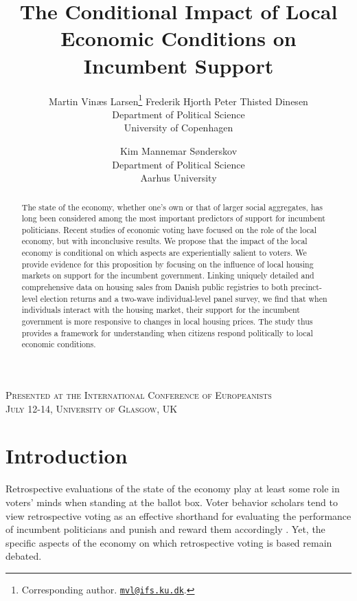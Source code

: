 \documentclass[12pt,a4paper]{article}
\title{\textbf{The Conditional Impact of Local Economic Conditions on Incumbent Support}}
\author{Martin Vinæs Larsen\thanks{Corresponding author. \href{mailto:mvl@ifs.ku.dk}{\texttt{mvl@ifs.ku.dk}}. } \qquad Frederik Hjorth \qquad Peter Thisted  Dinesen \\Department of Political Science \\ University of Copenhagen \and Kim Mannemar  Sønderskov  \\Department of Political Science \\ Aarhus University   }
\begin{document}
	
	\maketitle
	
	\begin{center}
		\textsc{Presented at the International Conference of Europeanists \\
			July 12-14, University of Glasgow, UK }
	\end{center}
	
	\begin{abstract} \noindent The state of the economy, whether one’s own or that of larger social aggregates, has long been considered among the most important predictors of support for incumbent politicians. Recent studies of economic voting have focused on the role of the local economy, but with inconclusive results. We propose that the impact of the local economy is conditional on which aspects are experientially salient to voters. We provide evidence for this proposition by focusing on the influence of local housing markets on support for the incumbent government. Linking uniquely detailed and comprehensive data on housing sales from Danish public registries to both precinct-level election returns and a two-wave individual-level panel survey, we find that when individuals interact with the housing market, their support for the incumbent government is more responsive to changes in local housing prices. The study thus provides a framework for understanding when citizens respond politically to local economic conditions.
		
	\end{abstract}
	
	
	
	\newpage
	
	\onehalfspacing
	
	\section{Introduction}
	
	\noindent Retrospective evaluations of the state of the economy play at least some role in voters' minds when standing at the ballot box. Voter behavior scholars tend to view retrospective voting as an effective shorthand for evaluating the performance of incumbent politicians and punish and reward them accordingly \citep{ashworth2012electoral,healy2013retrospective}. Yet, the specific aspects of the economy on which retrospective voting is based remain debated. 
	
\end{document}
